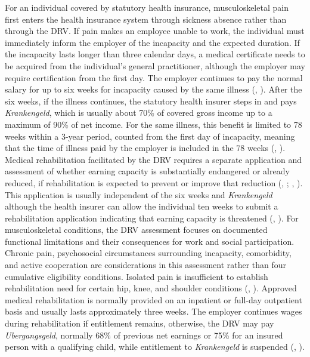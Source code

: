 \documentclass[a4paper,12pt]{article}
\theoremstyle{plain}
\theoremstyle{definition}
\theoremstyle{TheoremNum}
\theoremstyle{CorollaryNum}
\theoremstyle{PropositionNum}
\theoremstyle{TheoremNum}
\begin{document}
For an individual covered by statutory health insurance, musculoskeletal pain first enters the health insurance system through sickness absence rather than through the DRV. If pain makes an employee unable to work, the individual must immediately inform the employer of the incapacity and the expected duration. If the incapacity lasts longer than three calendar days, a medical certificate needs to be acquired from the individual's general practitioner, although the employer may require certification from the first day. The employer continues to pay the normal salary for up to six weeks for incapacity caused by the same illness (\citeauthor{entgfg1994}, \citeyear{entgfg1994}). After the six weeks, if the illness continues, the statutory health insurer steps in and pays \textit{Krankengeld}, which is usually about 70\% of covered gross income up to a maximum of 90\% of net income. For the same illness, this benefit is limited to 78 weeks within a 3-year period, counted from the first day of incapacity, meaning that the time of illness paid by the employer is included in the 78 weeks (\citeauthor{sgbv1988}, \citeyear{sgbv1988}). Medical rehabilitation facilitated by the DRV requires a separate application and assessment of whether earning capacity is substantially endangered or already reduced, if rehabilitation is expected to prevent or improve that reduction (\citeauthor{sgbvi1989}, \citeyear{sgbvi1989}; \citeauthor{drvGeneralReha}, \citeyear{drvGeneralReha}). This application is usually independent of the six weeks and \textit{Krankengeld} although the health insurer can allow the individual ten weeks to submit a rehabilitation application indicating that earning capacity is threatened (\citeauthor{sgbv1988}, \citeyear{sgbv1988}). For musculoskeletal conditions, the DRV assessment focuses on documented functional limitations and their consequences for work and social participation. Chronic pain, psychosocial circumstances surrounding incapacity, comorbidity, and active cooperation are considerations in this assessment rather than four cumulative eligibility conditions. Isolated pain is insufficient to establish rehabilitation need for certain hip, knee, and shoulder conditions (\citeauthor{drvMSCriteria2005}, \citeyear{drvMSCriteria2005}). Approved medical rehabilitation is normally provided on an inpatient or full-day outpatient basis and usually lasts approximately three weeks. The employer continues wages during rehabilitation if entitlement remains, otherwise, the DRV may pay \textit{Ubergangsgeld}, normally 68\% of previous net earnings or 75\% for an insured person with a qualifying child, while entitlement to \textit{Krankengeld} is suspended (\citeauthor{drvUebergangsgeld,sgbv1988}, \citeyear{drvUebergangsgeld,sgbv1988}).
\end{document}
